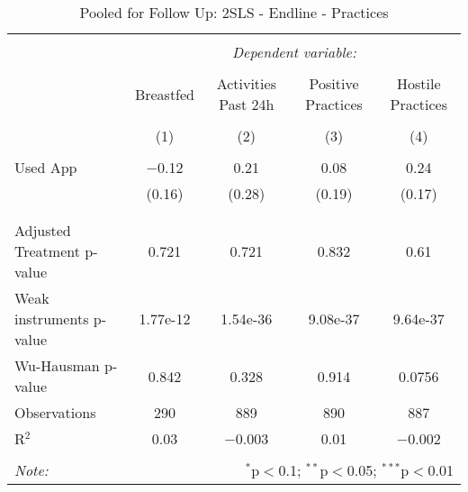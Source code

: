 
\begin{table}[!htbp] \centering 
  \caption{Pooled for Follow Up: 2SLS - Endline - Practices} 
  \label{tbl:Pooled for Follow Up: 2SLS - Endline - Practices} 
\begin{tabular}{@{\extracolsep{5pt}}lcccc} 
\\[-1.8ex]\hline 
\hline \\[-1.8ex] 
 & \multicolumn{4}{c}{\textit{Dependent variable:}} \\ 
\cline{2-5} 
\\[-1.8ex] & Breastfed & Activities Past 24h & Positive Practices & Hostile Practices \\ 
\\[-1.8ex] & (1) & (2) & (3) & (4)\\ 
\hline \\[-1.8ex] 
 Used App & $-$0.12 & 0.21 & 0.08 & 0.24 \\ 
  & (0.16) & (0.28) & (0.19) & (0.17) \\ 
  & & & & \\ 
\hline \\[-1.8ex] 
Adjusted Treatment p-value & 0.721 & 0.721 & 0.832 & 0.61 \\ 
Weak instruments p-value & 1.77e-12 & 1.54e-36 & 9.08e-37 & 9.64e-37 \\ 
Wu-Hausman p-value & 0.842 & 0.328 & 0.914 & 0.0756 \\ 
Observations & 290 & 889 & 890 & 887 \\ 
R$^{2}$ & 0.03 & $-$0.003 & 0.01 & $-$0.002 \\ 
\hline 
\hline \\[-1.8ex] 
\textit{Note:}  & \multicolumn{4}{r}{$^{*}$p$<$0.1; $^{**}$p$<$0.05; $^{***}$p$<$0.01} \\ 
\end{tabular} 
\end{table} 
